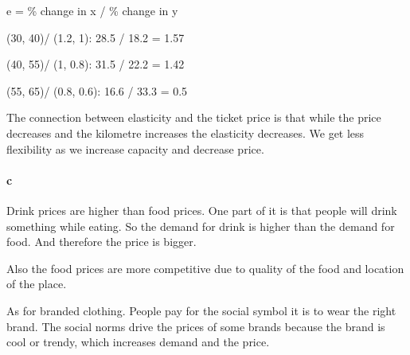 \documentclass[12pt, a4paper]{article}
\begin{document}
e = \% change in x / \% change in y

(30, 40)/ (1.2, 1): 28.5 / 18.2 = 1.57

(40, 55)/ (1, 0.8): 31.5 / 22.2  = 1.42

(55, 65)/ (0.8, 0.6): 16.6 / 33.3 = 0.5

The connection between elasticity and the ticket price is that while the price
decreases and the kilometre increases the elasticity decreases. We get less
flexibility as we increase capacity and decrease price.  

\paragraph{c}
Drink prices are higher than food prices.
One part of it is that people will drink something while eating. So the demand
for drink is higher than the demand for food. And therefore the price is
bigger. 

Also the food prices are more competitive due to quality of the food and
location of the place. 

As for branded clothing. People pay for the social symbol it is to wear the
right brand. The social norms drive the prices of some brands because the brand
is cool or trendy, which increases demand and the price.   
\end{document}

